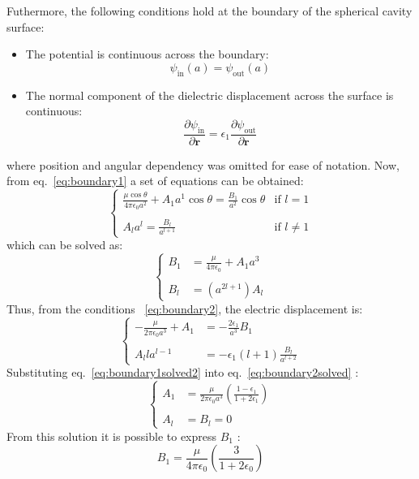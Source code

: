 \documentclass[11pt,oneside,a4paper]{article}
\begin{document}
Futhermore, the following conditions hold at the boundary of the spherical cavity surface:
\begin{itemize}
 \item The potential is continuous across the boundary:
 \begin{equation}
  \label{eq:boundary1}
  \psi_\mathrm{in}(a)  = \psi_\mathrm{out}(a) 
 \end{equation}
 \item The normal component of the dielectric displacement across the surface is continuous:
 \begin{equation}
  \label{eq:boundary2}
 \frac{\partial \psi_\mathrm{in}}{\partial \mathbf{r}} = \epsilon_1 \frac{\partial \psi_\mathrm{out}}{\partial \mathbf{r}} 
 \end{equation}
\end{itemize}
where position and angular dependency was omitted for ease of notation.
Now, from eq.~\ref{eq:boundary1} a set of equations can be obtained:
\begin{equation}
 \label{eq:boundary1solved}
 \begin{cases}
  \frac{\mu\cos\theta}{4\pi\epsilon_0 a^2} + A_1 a^1 \cos\theta = \frac{B_1}{a^2}\cos\theta   & \mbox{if } l=1 \\
  \\
  A_{l}a^{l} = \frac{B_{l}}{a^{l+1}} &\mbox{if } l\ne 1
 \end{cases}
\end{equation}
which can be solved as:
\begin{equation}
 \label{eq:boundary1solved2}
 \begin{cases}
  B_1 & = \frac{\mu}{4\pi\epsilon_0} + A_1 a^3 \\
  \\
  B_{l} &= (a^{2l + 1} )A_{l}
 \end{cases}
\end{equation}
Thus, from the conditions ~\ref{eq:boundary2}, the electric displacement is:
\begin{equation}
 \label{eq:boundary2solved}
 \begin{cases}
  -\frac{\mu}{2\pi\epsilon_0 a^3} + A_1  & = -\frac{2\epsilon_1}{a^3}B_1  \\
  \\
  A_{l} l a^{l-1} &  = -\epsilon_1 (l+1) \frac{B_{l}}{a^{l+2}} 
 \end{cases}
\end{equation}
Substituting eq.~\ref{eq:boundary1solved2} into eq.~\ref{eq:boundary2solved} :
\begin{equation}
\label{eq:boundary2solved2}
\begin{cases}
 A_1 &= \frac{\mu}{2\pi\epsilon_0 a^3}\left (\frac{1-\epsilon_1}{1+2\epsilon_1} \right ) \\
 \\
 A_{l} & = B_{l} = 0 
\end{cases} 
\end{equation}
From this solution it is possible to express $B_1$ :
\begin{equation}
 \label{eq:boundary2solved3}
 B_1 = \frac{\mu}{4\pi\epsilon_0}\left(\frac{3}{1+2\epsilon_0}\right)
\end{equation}
\end{document}

